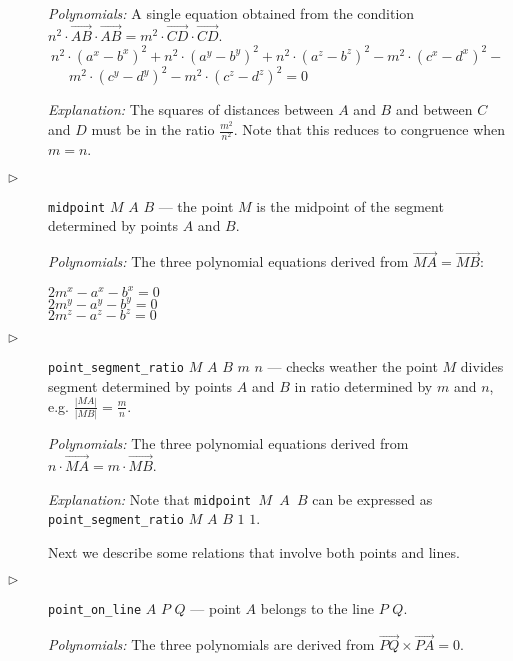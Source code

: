 \documentclass{article}
\begin{document}
\begin{description}
{\em Polynomials:} A single equation obtained from the condition
$n^2 \cdot \overrightarrow{AB} \cdot \overrightarrow{AB} = m^2 \cdot \overrightarrow{CD} \cdot \overrightarrow{CD}$. \\

$\ n^2\cdot(a^x - b^x)^2 + n^2\cdot(a^y - b^y)^2 + n^2\cdot(a^z - b^z)^2 - m^2\cdot(c^x - d^x)^2 - $ \\
\ \ \ $m^2\cdot(c^y - d^y)^2 - m^2\cdot(c^z - d^z)^2 = 0$

{\em Explanation:} The squares of distances between $A$ and $B$ and
between $C$ and $D$ must be in the ratio $\frac{m^2}{n^2}$. Note that
this reduces to congruence when $m = n$.

\item[$\triangleright$] {\tt midpoint} $M$ $A$ $B$ --- the point
  $M$ is the midpoint of the segment determined by points $A$ and
  $B$.

{\em Polynomials:} The three polynomial equations derived from $\overrightarrow{MA} = \overrightarrow{MB}$:

\begin{tabbing}
$2m^x - a^x - b^x = 0$ \\ 
$2m^y - a^y - b^y = 0$ \\ 
$2m^z - a^z - b^z = 0$
\end{tabbing}

\item[$\triangleright$] {\tt point\_segment\_ratio} $M$ $A$ $B$ $m$
  $n$ --- checks weather the point $M$ divides segment determined by
  points $A$ and $B$ in ratio determined by $m$ and $n$,
  e.g. $\frac{|MA|}{|MB|} = \frac{m}{n}$.

{\em Polynomials:} The three polynomial equations derived from
$n\cdot \overrightarrow{MA} = m\cdot \overrightarrow{MB}$.

{\em Explanation:} Note that {\tt midpoint $M$ $A$ $B$} can be
expressed as {\tt point\_segment\_ratio} $M$ $A$ $B$ $1$ $1$.

\bigskip

Next we describe some relations that involve both points and lines.

\item[$\triangleright$] {\tt point\_on\_line} $A$ $P$ $Q$ --- point
  $A$ belongs to the line $P$ $Q$.

{\em Polynomials:} The three polynomials are derived from
$\overrightarrow{PQ} \times \overrightarrow{PA} = 0$.


\end{description}
\end{document}
